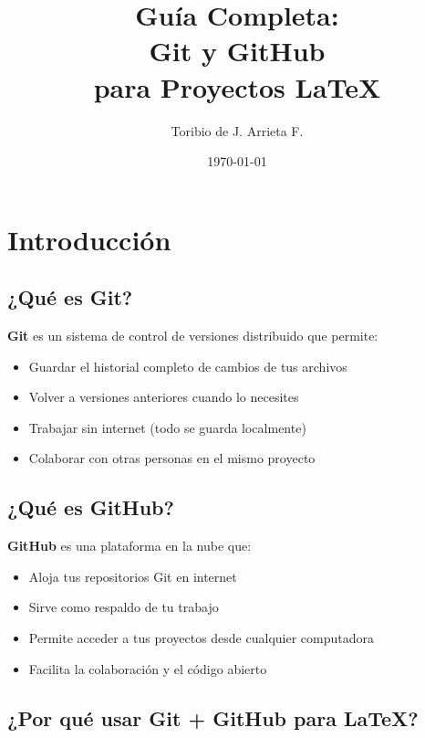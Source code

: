\documentclass[12pt,a4paper]{article}
\title{\Huge\bfseries Guía Completa:\\Git y GitHub\\para Proyectos LaTeX}
\author{\Large Toribio de J. Arrieta F.}
\date{\today}
\begin{document}
\maketitle
\tableofcontents
\newpage

\section{Introducción}

\subsection{¿Qué es Git?}

\textbf{Git} es un sistema de control de versiones distribuido que permite:
\begin{itemize}
  \item Guardar el historial completo de cambios de tus archivos
  \item Volver a versiones anteriores cuando lo necesites
  \item Trabajar sin internet (todo se guarda localmente)
  \item Colaborar con otras personas en el mismo proyecto
\end{itemize}

\subsection{¿Qué es GitHub?}

\textbf{GitHub} es una plataforma en la nube que:
\begin{itemize}
  \item Aloja tus repositorios Git en internet
  \item Sirve como respaldo de tu trabajo
  \item Permite acceder a tus proyectos desde cualquier computadora
  \item Facilita la colaboración y el código abierto
\end{itemize}

\subsection{¿Por qué usar Git + GitHub para LaTeX?}
\end{document}
